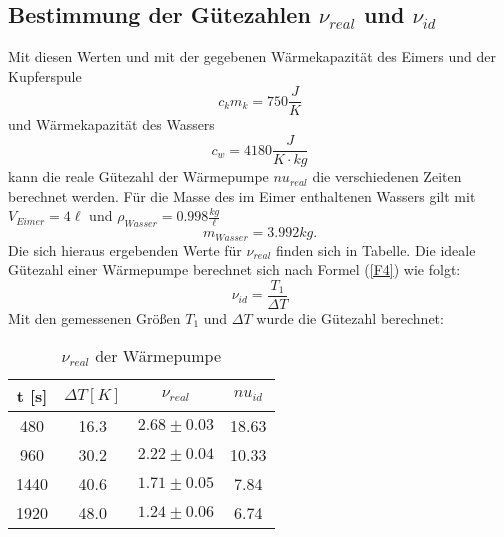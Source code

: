 \documentclass[11pt]{article}
\begin{document}
\subsection{Bestimmung der Gütezahlen $\nu_{real}$ und $\nu_{id}$}
\noindent Mit diesen Werten und mit der gegebenen Wärmekapazität des Eimers und der Kupferspule
\[c_km_k = 750\frac{J}{K}\]
und Wärmekapazität des Wassers 
\[c_w = 4180 \frac{J}{K\cdot kg}\]
kann die reale Gütezahl der Wärmepumpe $nu_{real}$ die verschiedenen Zeiten berechnet werden. Für die Masse des im Eimer enthaltenen Wassers gilt mit $V_{Eimer} = 4 \ell$ und $\rho_{Wasser} =0.998 \frac{kg}{\ell}$
\[m_{Wasser} = 3.992kg. \]
Die sich hieraus ergebenden Werte für $\nu_{real}$ finden sich in Tabelle.
Die ideale Gütezahl einer Wärmepumpe berechnet sich nach Formel (\ref{F4}) wie folgt:
\begin{equation}
\nu_{id} = \frac{T_1}{\Delta T}
\end{equation}
Mit den gemessenen Größen $T_1$ und $\Delta T$ wurde die Gütezahl berechnet:
\begin{table}[H]
\centering
\begin{tabular}{c|c|c|c}

t [s] & $\Delta T [K]$ & $\nu_{real}$ & $nu_{id}$ \\
\hline
480  & 16.3 &$ 2.68\pm0.03$ & 18.63\\
960  & 30.2 &$ 2.22\pm0.04$ & 10.33\\
1440 & 40.6 &$ 1.71\pm0.05$ &  7.84\\
1920 & 48.0 &$ 1.24\pm0.06$ &  6.74\\

\end{tabular}
\label{guetewerte}
\caption{$\nu_{real}$ der Wärmepumpe}
\end{table} 
\end{document}
